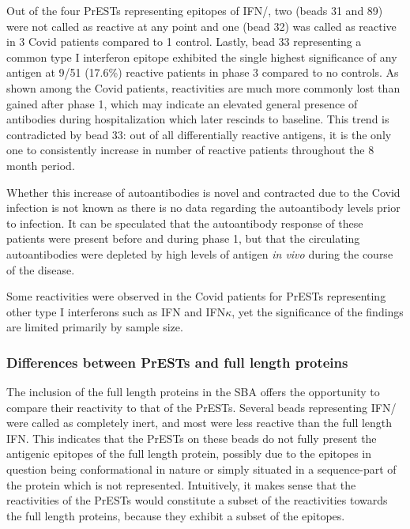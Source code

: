 \documentclass{article}
\begin{document}
Out of the four PrESTs representing epitopes of IFN\textalpha/\textomega, two (beads 31 and 89) were not called as reactive at any point and one (bead 32) was called as reactive in 3 Covid patients compared to 1 control. Lastly, bead 33 representing a common type I interferon epitope exhibited the single highest significance of any antigen at 9/51 (17.6\%) reactive patients in phase 3 compared to no controls. As shown among the Covid patients, reactivities are much more commonly lost than gained after phase 1, which may indicate an elevated general presence of antibodies during hospitalization which later rescinds to baseline. This trend is contradicted by bead 33: out of all differentially reactive antigens, it is the only one to consistently increase in number of reactive patients throughout the 8 month period.

Whether this increase of autoantibodies is novel and contracted due to the Covid infection is not known as there is no data regarding the autoantibody levels prior to infection. It can be speculated that the autoantibody response of these patients were present before and during phase 1, but that the circulating autoantibodies were depleted by high levels of antigen \textit{in vivo} during the course of the disease.

Some reactivities were observed in the Covid patients for PrESTs representing other type I interferons such as IFN\textepsilon{} and IFN$\kappa$, yet the significance of the findings are limited primarily by sample size.

\subsubsection{Differences between PrESTs and full length proteins}\label{disc_diff}
The inclusion of the full length proteins in the SBA offers the opportunity to compare their reactivity to that of the PrESTs. Several beads representing IFN\textalpha/\textomega{} were called as completely inert, and most were less reactive than the full length IFN\textomega{}. This indicates that the PrESTs on these beads do not fully present the antigenic epitopes of the full length protein, possibly due to the epitopes in question being conformational in nature or simply situated in a sequence-part of the protein which is not represented. Intuitively, it makes sense that the reactivities of the PrESTs would constitute a subset of the reactivities towards the full length proteins, because they exhibit a subset of the epitopes.
\end{document}
